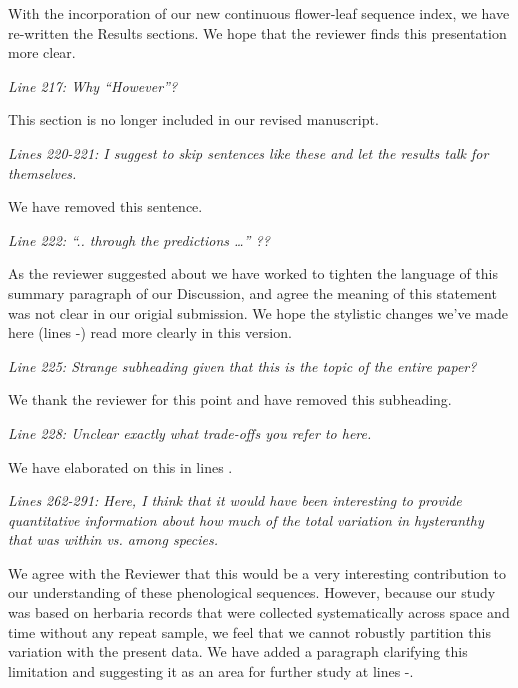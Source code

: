 \documentclass{article}[12pt]
\begin{document}
With the incorporation of our new continuous flower-leaf sequence index, we have re-written the Results sections. We hope that the reviewer finds this presentation more clear.

\emph{Line 217: Why “However”?}

This section is no longer included in our revised manuscript.

\emph{Lines 220-221: I suggest to skip sentences like these and let the results talk for themselves.}

We have removed this sentence.

\emph{Line 222: “.. through the predictions …” ??}

As the reviewer suggested about we have worked to tighten the language of this summary paragraph of our Discussion, and agree the meaning of this statement was not clear in our origial submission. We hope the stylistic changes we've made here (lines -) read more clearly in this version.

\emph{Line 225: Strange subheading given that this is the topic of the entire paper?}

We thank the reviewer for this point and have removed this subheading.


\emph{Line 228: Unclear exactly what trade-offs you refer to here.}

We have elaborated on this in lines .

\emph{Lines 262-291: Here, I think that it would have been interesting to provide quantitative information about how much of the total variation in hysteranthy that was within vs. among species.}

We agree with the Reviewer that this would be a very interesting contribution to our understanding of these phenological sequences. However, because our study was based on herbaria records that were collected systematically across space and time without any repeat sample, we feel that we cannot robustly partition this variation with the present data. We have added a paragraph clarifying this limitation and suggesting it as an area for further study at lines -.  
\end{document}
